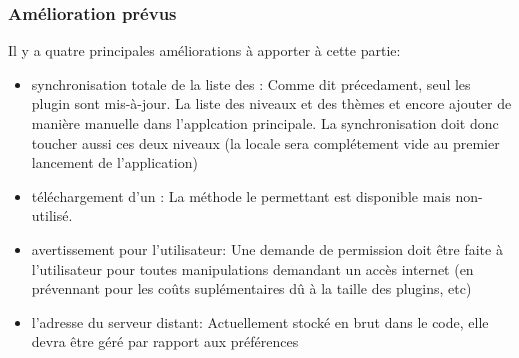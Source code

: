 \subsubsection{Amélioration prévus}
Il y a quatre principales améliorations à apporter à cette partie:
\begin{itemize}
    \item synchronisation totale de la liste des \plugin{}:
    \newline Comme dit précedament, seul les plugin sont mis-à-jour. La liste des niveaux et des thèmes et encore ajouter de manière manuelle dans l'applcation principale. La synchronisation doit donc toucher aussi ces deux niveaux (la \bdd{} locale sera complétement vide au premier lancement de l'application)
    \item téléchargement d'un \plugin{}:
    \newline La méthode le permettant est disponible mais non-utilisé.
    \item avertissement pour l'utilisateur:
    \newline Une demande de permission doit être faite à l'utilisateur pour toutes manipulations demandant un accès internet (en prévennant pour les coûts suplémentaires dû à la taille des plugins, etc)
    \item l'adresse du serveur distant:
    \newline Actuellement stocké en brut dans le code, elle devra être géré par rapport aux préférences
\end{itemize}
